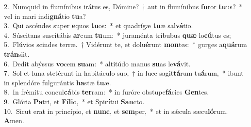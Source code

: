 {2.~}Numquid in flumínibus irátus es, Dómine?~† aut in flumínibus \textbf{fu}ror \textbf{tu}us?~* vel in mari indi\textbf{gná}tio \textbf{tu}a?\\
{3.~}Qui ascéndes super \textbf{e}quos \textbf{tu}os:~* et quadrígæ \textbf{tu}æ sal\textbf{vá}tio.\\
{4.~}Súscitans suscitábis \textbf{ar}cum \textbf{tu}um:~* juraménta tríbubus \textbf{quæ} lo\textbf{cú}tus es;\\
{5.~}Flúvios scindes terræ.~† Vidérunt te, et dolu\textbf{é}runt \textbf{mon}tes:~* gurges a\textbf{quá}rum \textbf{trán}siit.\\
{6.~}Dedit abýssus \textbf{vo}cem \textbf{su}am:~* altitúdo manus \textbf{su}as le\textbf{vá}vit.\\
{7.~}Sol et luna stetérunt in habitáculo suo,~† in luce sagit\textbf{tá}rum tu\textbf{á}rum,~* ibunt in splendóre fulgurántis \textbf{ha}stæ \textbf{tu}æ.\\
{8.~}In frémitu concul\textbf{cá}bis \textbf{ter}ram:~* in furóre obstupe\textbf{fá}cies \textbf{Gen}tes.\\
{9.~}Glória \textbf{Pa}tri, et \textbf{Fí}\textbf{li}o,~* et Spi\textbf{rí}tui \textbf{San}cto.\\
{10.~}Sicut erat in princípio, et \textbf{nunc}, et \textbf{sem}per,~* et in sǽcula sæcu\textbf{ló}rum. \textbf{A}men.\\
